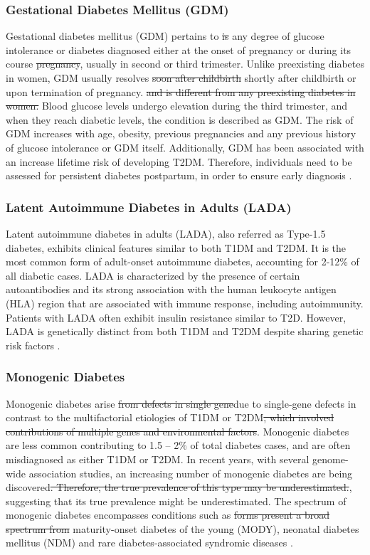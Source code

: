\subsubsection{Gestational Diabetes Mellitus (GDM)}
Gestational diabetes mellitus (GDM) pertains to \st{is} any degree of glucose intolerance or diabetes diagnosed either at the onset of pregnancy or during its course \st{pregnancy}, usually in second or third trimester. Unlike preexisting diabetes in women, GDM usually resolves \st{soon after childbirth} shortly after childbirth or upon termination of pregnancy. \st{and is different from any preexisting diabetes in women.} Blood glucose levels undergo elevation during the third trimester, and when they reach diabetic levels, the condition is described as GDM. The risk of GDM increases with age, obesity, previous pregnancies and any previous history of glucose intolerance or GDM itself. Additionally, GDM has been associated with an increase lifetime risk of developing T2DM. Therefore, individuals need to be assessed for persistent diabetes postpartum, in order to ensure early diagnosis \textbf{\cite{banday_pathophysiology_2020,egan_what_2019}}.

\subsubsection{Latent Autoimmune Diabetes in Adults (LADA)}
Latent autoimmune diabetes in adults (LADA), also referred as Type-1.5 diabetes, exhibits clinical features similar to both T1DM and T2DM. It is the most common form of adult-onset autoimmune diabetes, accounting for 2-12\% of all diabetic cases. LADA is characterized by the presence of certain autoantibodies and its strong association with the human leukocyte antigen (HLA) region that are associated with immune response, including autoimmunity. Patients with LADA often exhibit insulin resistance similar to T2D. However, LADA is genetically distinct from both T1DM and T2DM despite sharing genetic risk factors \textbf{\cite{banday_pathophysiology_2020,carlsson_etiology_2019,andersen_latent_2010,andersen_type_2014,cervin_genetic_2008}}. 

\subsubsection{Monogenic Diabetes}
Monogenic diabetes arise \st{from defects in single gene}due to single-gene defects in contrast to the multifactorial etiologies of T1DM or T2DM\st{, which involved contributions of multiple genes and environmental factors}. Monogenic diabetes are less common contributing to 1.5 – 2\% of total diabetes cases, and are often misdiagnosed as either T1DM or T2DM. In recent years, with several genome-wide association studies, an increasing number of monogenic diabetes are being discovered\st{. Therefore, the true prevalence of this type may be underestimated.}, suggesting that its true prevalence might be underestimated. The spectrum of  monogenic diabetes encompasses conditions such as \st{forms present a broad spectrum from }maturity-onset diabetes of the young (MODY), neonatal diabetes mellitus (NDM) and rare diabetes-associated syndromic diseases \textbf{\cite{home_idf_nodate}}. 

